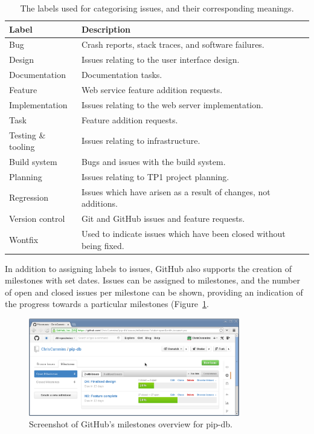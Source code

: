 \begin{table}[H]
\centering
\begin{tabular}{l l}
\textbf{Label} & \textbf{Description}\\
\hline
Bug & Crash reports, stack traces, and software failures.\\
Design & Issues relating to the user interface design.\\
Documentation & Documentation tasks.\\
Feature & Web service feature addition requests.\\
Implementation & Issues relating to the web server implementation.\\
Task & Feature addition requests.\\
Testing \& tooling & Issues relating to infrastructure.\\
Build system & Bugs and issues with the build system.\\
Planning & Issues relating to TP1 project planning.\\
Regression & Issues which have arisen as a result of changes, not additions.\\
Version control & Git and GitHub issues and feature requests.\\
Wontfix & Used to indicate issues which have been closed without being fixed.\\
\end{tabular}
\caption[Issue tracker labels]
        {The labels used for categorising issues, and their corresponding meanings.}
\label{tab:issue-labels}
\end{table}


In addition to assigning labels to issues, GitHub also supports the
creation of milestones with set dates. Issues can be assigned to
milestones, and the number of open and closed issues per milestone can
be shown, providing an indication of the progress towards a particular
milestones (Figure~\ref{fig:github-milestones}.


\begin{figure}[H]
\centering
    \includegraphics[width=0.82\textwidth]{assets/github-milestones}
\caption[GitHub project open milestones]
        {Screenshot of GitHub's milestones overview for pip-db.}
\label{fig:github-milestones}
\end{figure}


